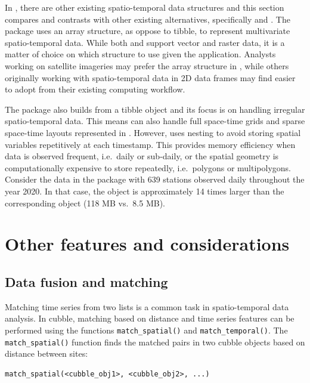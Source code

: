 \documentclass[
  shortnames]{jss}
\begin{document}
In , there are other existing spatio-temporal data structures and this section compares and contrasts  with other existing alternatives, specifically  and . The  package \citep{stars} uses an array structure, as oppose to tibble, to represent multivariate spatio-temporal data. While both  and  support vector and raster data, it is a matter of choice on which structure to use given the application. Analysts working on satellite imageries may prefer the array structure in , while others originally working with spatio-temporal data in 2D data frames may find  easier to adopt from their existing computing workflow.

The  package \citep{sftime} also builds from a tibble object and its focus is on handling irregular spatio-temporal data. This means  can also handle full space-time grids and sparse space-time layouts represented in . However,  uses nesting to avoid storing spatial variables repetitively at each timestamp. This provides memory efficiency when data is observed frequent, i.e.~daily or sub-daily, or the spatial geometry is computationally expensive to store repeatedly, i.e.~polygons or multipolygons. Consider the  data in the  package with 639 stations observed daily throughout the year 2020. In that case, the  object is approximately 14 times larger than the corresponding  object (118 MB vs.~8.5 MB).

\hypertarget{others}{%
\section{Other features and considerations}\label{others}}

\hypertarget{matching}{%
\subsection{Data fusion and matching}\label{matching}}

Matching time series from two lists is a common task in spatio-temporal data analysis. In cubble, matching based on distance and time series features can be performed using the functions \texttt{match\_spatial()} and \texttt{match\_temporal()}. The \texttt{match\_spatial()} function finds the matched pairs in two cubble objects based on distance between sites:

\begin{verbatim}
match_spatial(<cubble_obj1>, <cubble_obj2>, ...)
\end{verbatim}
\end{document}
